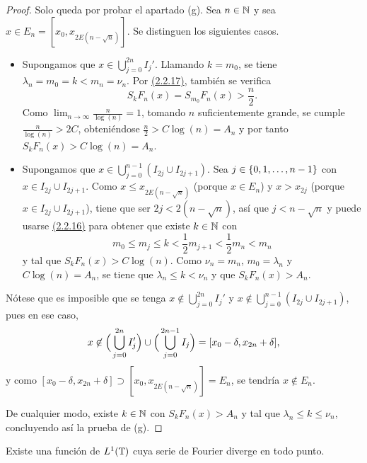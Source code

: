 \documentclass[a4paper, 12pt, oneside]{book}
\begin{document}
\begin{proof}
    Solo queda por probar el apartado (g). Sea $n \in \mathbb N$ y sea $x \in E_n=[x_0,x_{2E(n-\sqrt{n})}]$. Se distinguen los siguientes casos.
    \begin{itemize}
        \item Supongamos que $x\in\bigcup_{j=0}^{2n}I_j'$. Llamando $k = m_0$, se tiene $\lambda_n = m_0 = k < m_n = \nu_n$. Por \hyperref[2.2.17]{\color{blue}(2.2.17)}, también se verifica 
        \[S_{k}F_n(x) = S_{m_0}F_n(x) > \frac{n}{2}.\]
        Como $\lim_{n\to\infty} \frac{n}{\log(n)} = 1$, tomando $n$ suficientemente grande, se cumple $\frac{n}{\log(n)} > 2C$, obteniéndose $\frac{n}{2} > C\log(n) = A_n$ y por tanto $S_kF_n(x) > C\log(n) = A_n$.
        \item Supongamos que $x \in \bigcup_{j=0}^{n-1}(I_{2j}\cup I_{2j+1})$. Sea $j \in \{0,1,\mathellipsis,n-1\}$ con $x \in I_{2j} \cup I_{2j+1}$. Como $x \leq x_{2E(n-\sqrt{n})}$ (porque $x \in E_n$) y $x > x_{2j}$ (porque $x \in I_{2j} \cup I_{2j+1}$), tiene que ser $2j < 2(n-\sqrt{n})$, así que $j < n-\sqrt{n}$ y puede usarse \hyperref[2.2.16]{\color{blue}(2.2.16)} para obtener que existe $k \in \mathbb N$ con 
        \[m_0 \leq m_j \leq k < \frac{1}{2}m_{j+1} < \frac{1}{2}m_n < m_n\]
        y tal que $S_{k}F_n(x) >  C\log(n)$. Como $\nu_n = m_n$, $m_0 = \lambda_n$ y $C\log(n) = A_n$, se tiene que $\lambda_n \leq k < \nu_n$ y que $S_{k}F_n(x) > A_n$.
    \end{itemize}
    Nótese que es imposible que se tenga $x\not\in \bigcup_{j=0}^{2n}I_j'$ y $x \not\in \bigcup_{j=0}^{n-1}(I_{2j}\cup I_{2j+1})$, pues en ese caso,
    \[x\not\in \Bigl(\,\bigcup_{j=0}^{2n}I_j'\Bigr) \cup\Bigl(\,\bigcup_{j=0}^{2n-1}I_j\Bigr) = [x_0-\delta,x_{2n}+\delta],\]
    y como $[x_0-\delta,x_{2n}+\delta] \supset [x_0,x_{2E(n-\sqrt{n})}] = E_n$, se tendría $x \not\in E_n$.

    De cualquier modo, existe $k \in \mathbb N$ con $S_kF_n(x) > A_n$ y tal que $\lambda_n \leq k \leq \nu_n$, concluyendo así la prueba de (g).
\end{proof}

\begin{theorem}
    Existe una función de $L^1(\mathbb T)$ cuya serie de Fourier diverge en todo punto.
\end{theorem}
\end{document}
